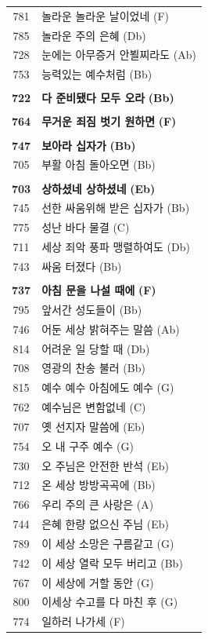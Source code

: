 \begin{supertabular}{c l}
781 & 놀라운 놀라운 날이었네 (F) \\
785 & 놀라운 주의 은혜 (Db) \\
728 & 눈에는 아무증거 안뵐찌라도 (Ab) \\
753 & 능력있는 예수처럼 (Bb) \\
 & \\
\textbf{722} & \textbf{다 준비됐다 모두 오라} \textbf{(Bb)} \\
 & \\
\textbf{764} & \textbf{무거운 죄짐 벗기 원하면} \textbf{(F)} \\
 & \\
\textbf{747} & \textbf{보아라 십자가} \textbf{(Bb)} \\
705 & 부활 아침 돌아오면 (Bb) \\
 & \\
\textbf{703} & \textbf{상하셨네 상하셨네} \textbf{(Eb)} \\
745 & 선한 싸움위해 받은 십자가 (Bb) \\
775 & 성난 바다 물결 (C) \\
711 & 세상 죄악 풍파 맹렬하여도 (Db) \\
743 & 싸움 터졌다 (Bb) \\
 & \\
\textbf{737} & \textbf{아침 문을 나설 때에} \textbf{(F)} \\
795 & 앞서간 성도들이 (Bb) \\
746 & 어둔 세상 밝혀주는 말씀 (Ab) \\
814 & 어려운 일 당할 때 (Db) \\
708 & 영광의 찬송 불러 (Bb) \\
815 & 예수 예수 아침에도 예수 (G) \\
762 & 예수님은 변함없네 (C) \\
707 & 옛 선지자 말씀에 (Eb) \\
754 & 오 내 구주 예수 (G) \\
730 & 오 주님은 안전한 반석 (Eb) \\
712 & 온 세상 방방곡곡에 (Bb) \\
766 & 우리 주의 큰 사랑은 (A) \\
744 & 은혜 한량 없으신 주님 (Eb) \\
789 & 이 세상 소망은 구름같고 (G) \\
742 & 이 세상 열락 모두 버리고 (Bb) \\
767 & 이 세상에 거할 동안 (G) \\
800 & 이세상 수고를 다 마친 후 (G) \\
774 & 일하러 나가세 (F) \\

\end{supertabular}
